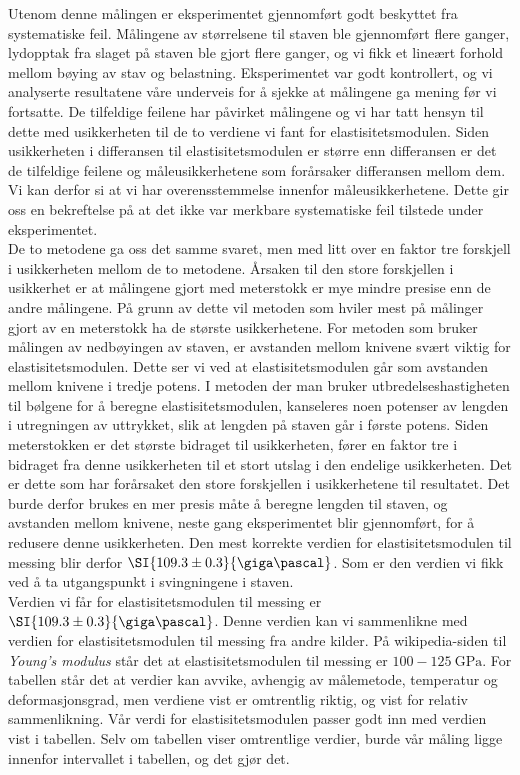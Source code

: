 \documentclass[%
 reprint,
nofootinbib,
aps,
]{revtex4-1}
\begin{document}
Utenom denne målingen er eksperimentet gjennomført godt beskyttet fra systematiske feil. Målingene av størrelsene til staven ble gjennomført flere ganger, lydopptak fra slaget på staven ble gjort flere ganger, og vi fikk et lineært forhold mellom bøying av stav og belastning. Eksperimentet var godt kontrollert, og vi analyserte resultatene våre underveis for å sjekke at målingene ga mening før vi fortsatte. De tilfeldige feilene har påvirket målingene og vi har tatt hensyn til dette med usikkerheten til de to verdiene vi fant for elastisitetsmodulen. Siden usikkerheten i differansen til elastisitetsmodulen er større enn differansen er det de tilfeldige feilene og måleusikkerhetene som forårsaker differansen mellom dem. Vi kan derfor si at vi har overensstemmelse innenfor måleusikkerhetene. Dette gir oss en bekreftelse på at det ikke var merkbare systematiske feil tilstede under eksperimentet.
\\De to metodene ga oss det samme svaret, men med litt over en faktor tre forskjell i usikkerheten mellom de to metodene. Årsaken til den store forskjellen i usikkerhet er at målingene gjort med meterstokk er mye mindre presise enn de andre målingene. På grunn av dette vil metoden som hviler mest på målinger gjort av en meterstokk ha de største usikkerhetene. For metoden som bruker målingen av nedbøyingen av staven, er avstanden mellom knivene svært viktig for elastisitetsmodulen. Dette ser vi ved at elastisitetsmodulen går som avstanden mellom knivene i tredje potens. I metoden der man bruker utbredelseshastigheten til bølgene for å beregne elastisitetsmodulen, kanseleres noen potenser av lengden i utregningen av uttrykket, slik at lengden på staven går i første potens. Siden meterstokken er det største bidraget til usikkerheten, fører en faktor tre i bidraget fra denne usikkerheten til et stort utslag i den endelige usikkerheten. Det er dette som har forårsaket den store forskjellen i usikkerhetene til resultatet. Det burde derfor brukes en mer presis måte å beregne lengden til staven, og avstanden mellom knivene, neste gang eksperimentet blir gjennomført, for å redusere denne usikkerheten. Den mest korrekte verdien for elastisitetsmodulen til messing blir derfor $\SI{109.3\pm0.3}{\giga\pascal}$. Som er den verdien vi fikk ved å ta utgangspunkt i svingningene i staven. \\
Verdien vi får for elastisitetsmodulen til messing er $\SI{109.3\pm0.3}{\giga\pascal}$. Denne verdien kan vi sammenlikne med verdien for elastisitetsmodulen til messing fra andre kilder. På wikipedia-siden til \textit{Young's modulus} \cite{wiki1} står det at elastisitetsmodulen til messing er $100-\SI{125}{\giga\pascal}$. For tabellen står det at verdier kan avvike, avhengig av målemetode, temperatur og deformasjonsgrad, men verdiene vist er omtrentlig riktig, og vist for relativ sammenlikning. Vår verdi for elastisitetsmodulen passer godt inn med verdien vist i tabellen. Selv om tabellen viser omtrentlige verdier, burde vår måling ligge innenfor intervallet i tabellen, og det gjør det.
\end{document}
